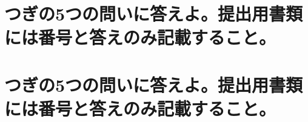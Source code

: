 \documentclass[titlepage,a4paper]{jsarticle}
\begin{document}
\section{つぎの5つの問いに答えよ。提出用書類には番号と答えのみ記載すること。}%
\section{つぎの5つの問いに答えよ。提出用書類には番号と答えのみ記載すること。}%
\end{document}
